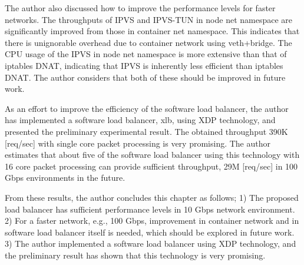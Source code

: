 The author also discussed how to improve the performance levels for faster networks.
The throughputs of IPVS and IPVS-TUN in node net namespace are significantly improved from those in container net namespace.
This indicates that there is unignorable overhead due to container network using veth+bridge.
The CPU usage of the IPVS in node net namespace is more extensive than that of iptables DNAT, indicating that IPVS is inherently less efficient than iptables DNAT.
The author considers that both of these should be improved in future work.



As an effort to improve the efficiency of the software load balancer, 
the author has implemented a software load balancer, xlb, using XDP technology, and presented the preliminary experimental result.
The obtained throughput 390K [req/sec] with single core packet processing is very promising.
The author estimates that about five of the software load balancer using this technology with 16 core packet processing can provide sufficient throughput, 29M [req/sec] in 100 Gbps environments in the future. 


From these results, the author concludes this chapter as follows;
1) The proposed load balancer has sufficient performance levels in 10 Gbps network environment.
2) For a faster network, e.g., 100 Gbps, improvement in container network and in software load balancer itself is needed, which should be explored in future work.
3) The author implemented a software load balancer using XDP technology, and the preliminary result has shown that this technology is very promising.

